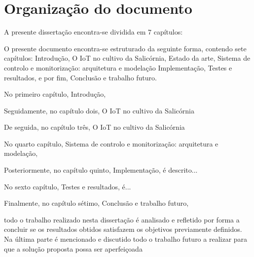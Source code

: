 \section{Organização do documento}


A presente dissertação encontra-se dividida em 7 capítulos:

O presente documento encontra-se estruturado da seguinte forma, contendo sete capítulos: Introdução, O \ac{IoT} no cultivo da Salicórnia, Estado da arte,  Sistema de controlo e monitorização: arquitetura e modelação Implementação, Testes e resultados, e por fim, Conclusão e trabalho futuro.


No primeiro capítulo, Introdução, 



Seguidamente, no capítulo dois, O \ac{IoT} no cultivo da Salicórnia



De seguida, no capítulo três, O \ac{IoT} no cultivo da Salicórnia



No quarto capítulo, Sistema de controlo e monitorização: arquitetura e modelação, 


Posteriormente, no capítulo quinto, Implementação, é descrito... 



No sexto capítulo, Testes e resultados, é... 


Finalmente, no capítulo sétimo, Conclusão e trabalho futuro, 



todo o trabalho realizado nesta dissertação é analisado e
refletido por forma a concluir se os resultados obtidos satisfazem os objetivos previamente
definidos. Na última parte é mencionado e discutido todo o trabalho futuro a realizar para
que a solução proposta possa ser aperfeiçoada


























